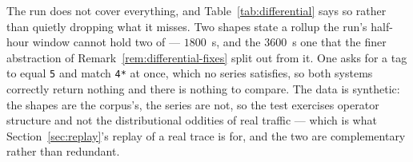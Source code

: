 \begin{remark}\label{rem:differential-limits}
The run does not cover everything, and Table~\ref{tab:differential} says so rather than
quietly dropping what it misses. Two shapes state a rollup the run's half-hour window
cannot hold two of --- $1800$~s, and the $3600$~s one that the finer abstraction of
Remark~\ref{rem:differential-fixes} split out from it. One asks for a tag to equal \texttt{5} and match
\texttt{4*} at once, which no series satisfies, so both systems correctly return nothing
and there is nothing to compare. The data is synthetic: the shapes are the corpus's, the
series are not, so the test exercises operator structure and not the distributional
oddities of real traffic --- which is what Section~\ref{sec:replay}'s replay of a real
trace is for, and the two are complementary rather than redundant.
\end{remark}
